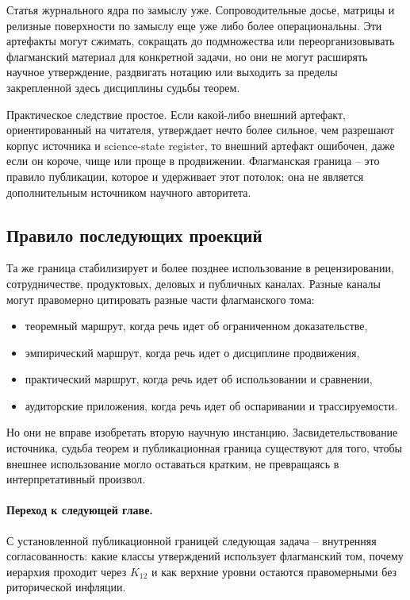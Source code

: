 Статья журнального ядра по замыслу уже. Сопроводительные досье, матрицы и
релизные поверхности по замыслу еще уже либо более операциональны. Эти
артефакты могут сжимать, сокращать до подмножества или переорганизовывать
флагманский материал для конкретной задачи, но они не могут расширять научное
утверждение, раздвигать нотацию или выходить за пределы закрепленной здесь
дисциплины судьбы теорем.

Практическое следствие простое. Если какой-либо внешний артефакт,
ориентированный на читателя, утверждает нечто более сильное, чем разрешают
корпус источника и science-state register, то внешний артефакт ошибочен, даже если он короче,
чище или проще в продвижении. Флагманская граница -- это правило публикации,
которое и удерживает этот потолок; она не является дополнительным источником
научного авторитета.

\subsection{Правило последующих проекций}

Та же граница стабилизирует и более позднее использование в рецензировании,
сотрудничестве, продуктовых, деловых и публичных каналах. Разные каналы могут
правомерно цитировать разные части флагманского тома:

\begin{itemize}
\item теоремный маршрут, когда речь идет об ограниченном доказательстве,
\item эмпирический маршрут, когда речь идет о дисциплине продвижения,
\item практический маршрут, когда речь идет об использовании и сравнении,
\item аудиторские приложения, когда речь идет об оспаривании и
      трассируемости.
\end{itemize}

Но они не вправе изобретать вторую научную инстанцию. Засвидетельствование
источника, судьба теорем и публикационная граница существуют для того, чтобы
внешнее использование могло оставаться кратким, не превращаясь в
интерпретативный произвол.

\paragraph{Переход к следующей главе.}
С установленной публикационной границей следующая задача -- внутренняя
согласованность: какие классы утверждений использует флагманский том, почему
иерархия проходит через \(K_{12}\) и как верхние уровни остаются правомерными
без риторической инфляции.

\clearpage
